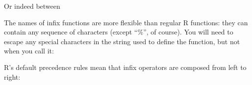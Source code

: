 Or indeed between 

\begin{Shaded}
\begin{Highlighting}[]
 \NormalTok{+}\StringTok{ }
\DataTypeTok{+}\NormalTok{(}\NormalTok{, }\NormalTok{)}
\end{Highlighting}
\end{Shaded}

The names of infix functions are more flexible than regular R functions:
they can contain any sequence of characters (except ``\%'', of course).
You will need to escape any special characters in the string used to
define the function, but not when you call it:

\begin{Shaded}
\end{Shaded}

R's default precedence rules mean that infix operators are composed from
left to right:

\begin{Shaded}
\end{Shaded}

